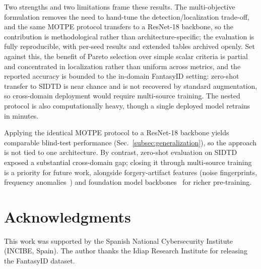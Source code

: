 \documentclass[final,5p,times,twocolumn,number]{elsarticle}
\newcommand{\rev}[1]{#1}
\newcommand{\revB}[1]{#1}
\begin{document}
\revB{Two strengths and two limitations frame these results. The multi-objective
formulation removes the need to hand-tune the detection/localization trade-off, and
the same MOTPE protocol transfers to a ResNet-18 backbone, so the contribution is
methodological rather than architecture-specific; the evaluation is fully
reproducible, with per-seed results and extended tables archived openly. Set against
this, the benefit of Pareto selection over simple scalar criteria is partial and
concentrated in localization rather than uniform across metrics, and the reported
accuracy is bounded to the in-domain FantasyID setting: zero-shot transfer to SIDTD
is near chance and is not recovered by standard augmentation, so cross-domain
deployment would require multi-source training. The nested protocol is also
computationally heavy, though a single deployed model retrains in minutes.}

\rev{Applying the identical MOTPE protocol to a ResNet-18 backbone yields
comparable blind-test performance (Sec.~\ref{subsec:generalization}), so the
approach is not tied to one architecture. By contrast, zero-shot evaluation on
SIDTD exposed a substantial cross-domain gap; closing it through multi-source
training is a priority for future work}, alongside forgery-artifact features
(noise fingerprints, frequency anomalies~\citep{cozzolino2020noiseprint}) and
foundation model backbones~\citep{fakeidet2025} for richer pre-training.

\section*{Acknowledgments}
This work was supported by the Spanish National Cybersecurity Institute (INCIBE,
Spain). The author thanks the Idiap Research Institute for releasing the
FantasyID dataset.

\end{document}
